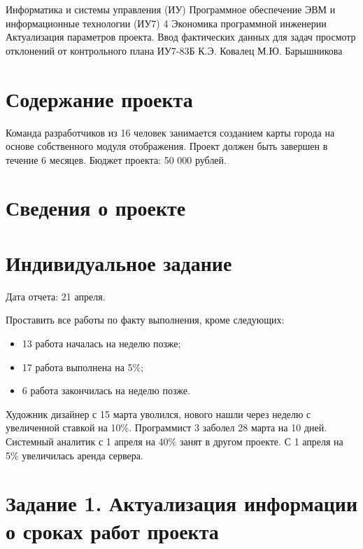 \documentclass{bmstu}
\begin{document}
\makereporttitle
{Информатика и системы управления (ИУ)}
{Программное обеспечение ЭВМ и информационные технологии (ИУ7)}
{4}
{Экономика программной инженерии}
{Актуализация параметров проекта. Ввод фактических данных для задач просмотр отклонений от контрольного плана}
{}
{ИУ7-83Б}
{К.Э. Ковалец}
{М.Ю. Барышникова}


\setcounter{page}{2}

\section*{Содержание проекта}

Команда разработчиков из 16 человек занимается созданием карты города на основе собственного модуля отображения. Проект должен быть завершен в течение 6 месяцев. Бюджет проекта: 50 000 рублей.

\section*{Сведения о проекте}



\section*{Индивидуальное задание}

Дата отчета: 21 апреля.

Проставить все работы по факту выполнения, кроме следующих:

\begin{itemize}
    \item 13 работа началась на неделю позже;
    \item 17 работа выполнена на 5\%;
    \item 6 работа закончилась на неделю позже.
\end{itemize}

Художник дизайнер с 15 марта уволился, нового нашли через неделю с увеличенной ставкой на 10\%.
Программист 3 заболел 28 марта на 10 дней.
Системный аналитик с 1 апреля на 40\% занят в другом проекте.
С 1 апреля на 5\% увеличилась аренда сервера.

\section*{Задание 1. Актуализация информации о сроках работ проекта}
\end{document}
